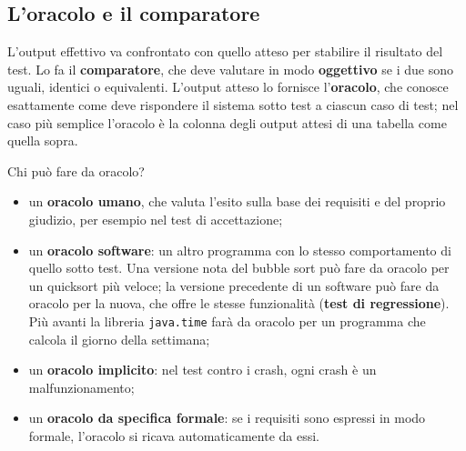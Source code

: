 \subsection{L'oracolo e il comparatore}

L'output effettivo va confrontato con quello atteso per stabilire il risultato del test. Lo fa il
\textbf{comparatore}, che deve valutare in modo \textbf{oggettivo} se i due sono uguali, identici o equivalenti. L'output
atteso lo fornisce l'\textbf{oracolo}, che conosce esattamente come deve rispondere il sistema sotto test a ciascun
caso di test; nel caso più semplice l'oracolo è la colonna degli output attesi di una tabella come quella sopra.

\begin{center}
\end{center}

Chi può fare da oracolo?

\begin{itemize}
  \item un \textbf{oracolo umano}, che valuta l'esito sulla base dei requisiti e del proprio giudizio, per esempio nel
        test di accettazione;
  \item un \textbf{oracolo software}: un altro programma con lo stesso comportamento di quello sotto test. Una versione
        nota del bubble sort può fare da oracolo per un quicksort più veloce; la versione precedente di un software
        può fare da oracolo per la nuova, che offre le stesse funzionalità (\textbf{test di regressione}). Più avanti
        la libreria \texttt{java.time} farà da oracolo per un programma che calcola il giorno della settimana;
  \item un \textbf{oracolo implicito}: nel test contro i crash, ogni crash è un malfunzionamento;
  \item un \textbf{oracolo da specifica formale}: se i requisiti sono espressi in modo formale, l'oracolo si ricava
        automaticamente da essi.
\end{itemize}


